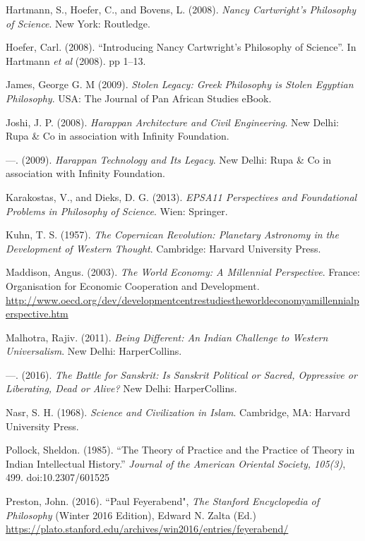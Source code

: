 \begin{thebibliography}{99}
  Hartmann, S., Hoefer, C., and Bovens, L. (2008). \textit{Nancy Cartwright's Philosophy of Science}. New York: Routledge.

  Hoefer, Carl. (2008). “Introducing Nancy Cartwright’s Philosophy of Science”. In Hartmann \textit{et al} (2008). pp 1--13.

  James, George G. M (2009). \textit{Stolen Legacy: Greek Philosophy is Stolen Egyptian Philosophy}. USA: The Journal of Pan African Studies eBook.

  Joshi, J. P. (2008). \textit{Harappan Architecture and Civil Engineering}. New Delhi: Rupa \& Co in association with Infinity Foundation.

  —. (2009). \textit{Harappan Technology and Its Legacy}. New Delhi: Rupa \& Co in association with Infinity Foundation.

  Karakostas, V., and Dieks, D. G. (2013). \textit{EPSA11 Perspectives and Foundational Problems in Philosophy of Science}. Wien: Springer.

  Kuhn, T. S. (1957). \textit{The Copernican Revolution: Planetary Astronomy in the Development of Western Thought}. Cambridge: Harvard University Press.

  Maddison, Angus. (2003). \textit{The World Economy: A Millennial Perspective}. France: Organisation for Economic Cooperation and Development. \url{http://www.oecd.org/dev/developmentcentrestudiestheworldeconomyamillennialperspective.htm}

  Malhotra, Rajiv. (2011). \textit{Being Different: An Indian Challenge to Western Universalism}. New Delhi: HarperCollins.

  —. (2016). \textit{The Battle for Sanskrit: Is Sanskrit Political or Sacred, Oppressive or Liberating, Dead or Alive?} New Delhi: HarperCollins.

  Nasr, S. H. (1968). \textit{Science and Civilization in Islam}. Cambridge, MA: Harvard University Press.

  Pollock, Sheldon. (1985). “The Theory of Practice and the Practice of Theory in Indian Intellectual History.” \textit{Journal of the American Oriental Society, 105(3)}, 499. doi:10.2307/601525

  Preston, John. (2016). “Paul Feyerabend", \textit{The Stanford Encyclopedia of Philosophy} (Winter 2016 Edition), Edward N. Zalta (Ed.) \url{https://plato.stanford.edu/archives/win2016/entries/feyerabend/}
 

\end{thebibliography}
